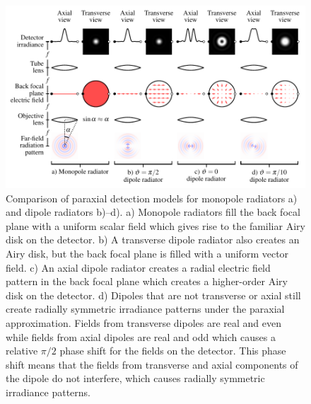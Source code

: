 \documentclass[]{osa-article}
\begin{document}
\begin{figure}[h]
 \centering
   \centering
   \includegraphics[scale=0.8]{../figures/microscope/microscope.pdf}
   \caption{Comparison of paraxial detection models for monopole radiators a)
     and dipole radiators b)--d). a) Monopole radiators fill the back focal
     plane with a uniform scalar field which gives rise to the familiar Airy
     disk on the detector. b) A transverse dipole radiator also creates an Airy
     disk, but the back focal plane is filled with a uniform vector field. c) An
     axial dipole radiator creates a radial electric field pattern in the back
     focal plane which creates a higher-order Airy disk on the detector. d)
     Dipoles that are not transverse or axial still create radially symmetric
     irradiance patterns under the paraxial approximation. Fields from
     transverse dipoles are real and even while fields from axial dipoles are
     real and odd which causes a relative $\pi/2$ phase shift for the fields on
     the detector. This phase shift means that the fields from transverse and
     axial components of the dipole do not interfere, which causes radially
     symmetric irradiance patterns.}
   \label{fig:microscope}
 \end{figure}
\end{document}

